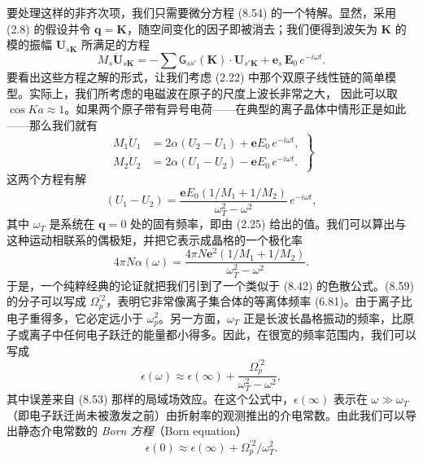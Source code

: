 要处理这样的非齐次项，我们只需要微分方程 (8.54) 的一个特解。显然，采用 (2.8) 的假设并令 $\boldsymbol{q}=\mathbf{K}$，随空间变化的因子即被消去；我们便得到波矢为 $\mathbf{K}$ 的模的振幅 $\mathbf{U}_{s\mathbf{K}}$ 所满足的方程
\begin{equation*}
M_s \ddot{\mathbf{U}}_{s\mathbf{K}} = -\sum \mathsf{G}_{ss'}(\mathbf{K})\cdot\mathbf{U}_{s'\mathbf{K}} + \boldsymbol{e}_s\,\mathbf{E}_0\,e^{-i\omega t}.\tag{8.56}
\end{equation*}
要看出这些方程之解的形式，让我们考虑 (2.22) 中那个双原子线性链的简单模型。实际上，我们所考虑的电磁波在原子的尺度上波长非常之大，
因此可以取 $\cos Ka \approx 1$。如果两个原子带有异号电荷——在典型的离子晶体中情形正是如此——那么我们就有
\begin{equation*}
\left.
\begin{aligned}
M_1 \ddot{U}_1 &= 2\alpha(U_2-U_1) + \boldsymbol{e}E_0\,e^{-i\omega t},\\
M_2 \ddot{U}_2 &= 2\alpha(U_1-U_2) - \boldsymbol{e}E_0\,e^{-i\omega t}.
\end{aligned}
\right\}
\tag{8.57}
\end{equation*}
这两个方程有解
\begin{equation*}
(U_1-U_2) = \frac{\boldsymbol{e}E_0(1/M_1+1/M_2)}{\omega_T^2-\omega^2}\,e^{-i\omega t},\tag{8.58}
\end{equation*}
其中 $\omega_T$ 是系统在 $\boldsymbol{q}=0$ 处的固有频率，即由 (2.25) 给出的值。我们可以算出与这种运动相联系的偶极矩，并把它表示成晶格的一个极化率
\begin{equation*}
4\pi N\alpha(\omega) = \frac{4\pi N\boldsymbol{e}^2(1/M_1+1/M_2)}{\omega_T^2-\omega^2}.\tag{8.59}
\end{equation*}
于是，一个纯粹经典的论证就把我们引到了一个类似于 (8.42) 的色散公式。(8.59) 的分子可以写成 $\Omega_p^{\prime 2}$，表明它非常像离子集合体的等离体频率 (6.81)。由于离子比电子重得多，它必定远小于 $\omega_p^2$。另一方面，$\omega_T$ 正是长波长晶格振动的频率，比原子或离子中任何电子跃迁的能量都小得多。因此，在很宽的频率范围内，我们可以写成
\begin{equation*}
\epsilon(\omega) \approx \epsilon(\infty) + \frac{\Omega_p^{\prime 2}}{\omega_T^2-\omega^2},\tag{8.60}
\end{equation*}
其中误差来自 (8.53) 那样的局域场效应。在这个公式中，$\epsilon(\infty)$ 表示在 $\omega \gg \omega_T$（即电子跃迁尚未被激发之前）由折射率的观测推出的介电常数。由此我们可以导出静态介电常数的 \emph{Born 方程}（Born equation）
\begin{equation*}
\epsilon(0) \approx \epsilon(\infty) + \Omega_p^{\prime 2}/\omega_T^2.\tag{8.61}
\end{equation*}
